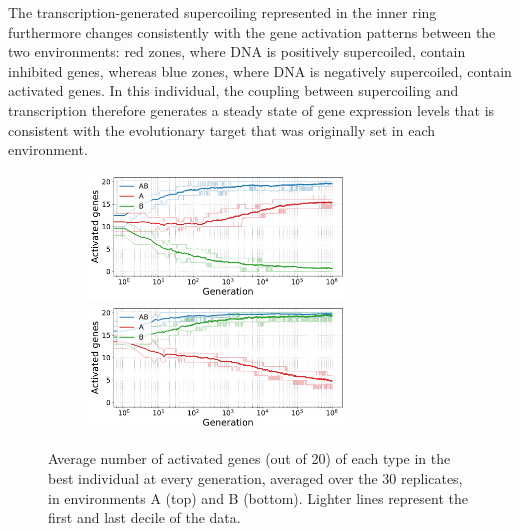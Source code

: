 The transcription-generated supercoiling represented in the inner ring furthermore changes consistently with the gene activation patterns between the two environments: red zones, where DNA is positively supercoiled, contain inhibited genes, whereas blue zones, where DNA is negatively supercoiled, contain activated genes.
In this individual, the coupling between supercoiling and transcription therefore generates a steady state of gene expression levels that is consistent with the evolutionary target that was originally set in each environment.

\begin{figure}[H]
  \begin{subfigure}[t]{\textwidth}
    \centering
    \includegraphics[width=0.75\textwidth]{ploscb/img/gene_activity_env_A_quantile.pdf}
    \includegraphics[width=0.75\textwidth]{ploscb/img/gene_activity_env_B_quantile.pdf}
  \end{subfigure}
  \caption{Average number of activated genes (out of 20) of each type in the best individual at every generation, averaged over the 30 replicates, in environments A (top) and B (bottom).
  Lighter lines represent the first and last decile of the data.}
  \label{fig:gene_activity_by_env}
\end{figure}

